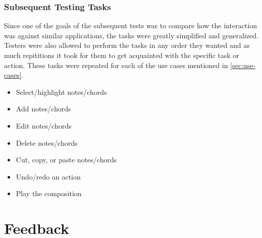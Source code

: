 			\subsubsection{Subsequent Testing Tasks}
			\label{sec:subsequent-tasks}

				Since one of the goals of the subsequent tests was to compare how the interaction was against similar applications, the tasks were greatly simplified and generalized. Testers were also allowed to perform the tasks in any order they wanted and as much repititions it took for them to get acquainted with the specific task or action. These tasks were repeated for each of the use cases mentioned in \ref{sec:use-cases}.

				\begin{itemize}
					\item Select/highlight notes/chords
				  	\item Add notes/chords
				  	\item Edit notes/chords
				  	\item Delete notes/chords
				  	\item Cut, copy, or paste notes/chords
				  	\item Undo/redo an action
				  	\item Play the composition
				\end{itemize}


	\section{Feedback}

